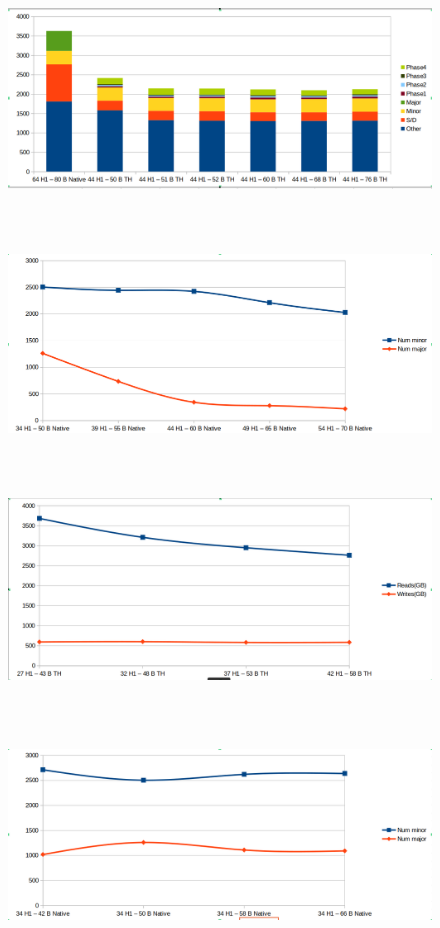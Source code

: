 \documentclass[twocolumn,10pt]{asme2e}
\begin{document}
\begin{figure}[h!]
        \includegraphics[width=12cm,height=6cm]{pr_pc_th.png}
\end{figure}

\begin{figure}[h!]
        \includegraphics[width=12cm,height=6cm]{rw_linr_h1_native.png}
\end{figure}

\begin{figure}[h!]
        \includegraphics[width=12cm,height=6cm]{rw_linr_h1_th.png}
\end{figure}

\begin{figure}[h!]
        \includegraphics[width=12cm,height=6cm]{rw_linr_pc_native.png}
\end{figure}
\end{document}
